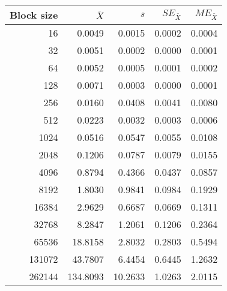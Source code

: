 \begin{tabular}{rrrrr}\toprule
{\small Block size} & $\bar{X}$ & $s$ & $SE_{\bar{X}}$ & $ME_{\bar{X}}$ \\\midrule
16 & 0.0049 & 0.0015 & 0.0002 & 0.0004\\
32 & 0.0051 & 0.0002 & 0.0000 & 0.0001\\
64 & 0.0052 & 0.0005 & 0.0001 & 0.0002\\
128 & 0.0071 & 0.0003 & 0.0000 & 0.0001\\
256 & 0.0160 & 0.0408 & 0.0041 & 0.0080\\
512 & 0.0223 & 0.0032 & 0.0003 & 0.0006\\
1024 & 0.0516 & 0.0547 & 0.0055 & 0.0108\\
2048 & 0.1206 & 0.0787 & 0.0079 & 0.0155\\
4096 & 0.8794 & 0.4366 & 0.0437 & 0.0857\\
8192 & 1.8030 & 0.9841 & 0.0984 & 0.1929\\
16384 & 2.9629 & 0.6687 & 0.0669 & 0.1311\\
32768 & 8.2847 & 1.2061 & 0.1206 & 0.2364\\
65536 & 18.8158 & 2.8032 & 0.2803 & 0.5494\\
131072 & 43.7807 & 6.4454 & 0.6445 & 1.2632\\
262144 & 134.8093 & 10.2633 & 1.0263 & 2.0115\\
\bottomrule
\end{tabular}
